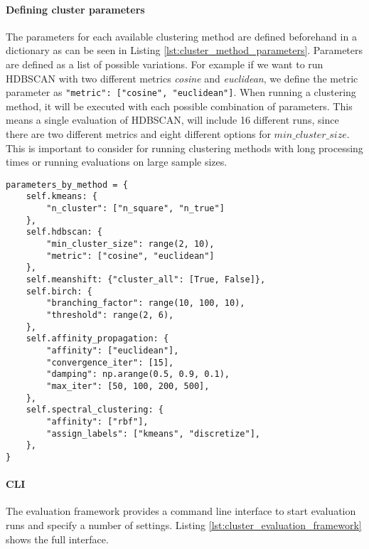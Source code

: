 \paragraph{Defining cluster parameters} The parameters for each available clustering method are defined beforehand in a dictionary as can be seen in Listing \ref{lst:cluster_method_parameters}. Parameters are defined as a list of possible variations. For example if we want to run HDBSCAN with two different metrics  \textit{cosine} and \textit{euclidean}, we define the metric parameter as \lstinline{"metric": ["cosine", "euclidean"]}. When running a clustering method, it will be executed with each possible combination of parameters. This means a single evaluation of HDBSCAN, will include 16 different runs, since there are two different metrics and eight different options for $min\_cluster\_size$. This is important to consider for running clustering methods with long processing times or running evaluations on large sample sizes. 

\begin{lstlisting}[caption=Predefined parameters for different clustering methods,label={lst:cluster_method_parameters}]
parameters_by_method = {
    self.kmeans: {
        "n_cluster": ["n_square", "n_true"]
    },
    self.hdbscan: {
        "min_cluster_size": range(2, 10),
        "metric": ["cosine", "euclidean"]
    },
    self.meanshift: {"cluster_all": [True, False]},
    self.birch: {
        "branching_factor": range(10, 100, 10),
        "threshold": range(2, 6),
    },
    self.affinity_propagation: {
        "affinity": ["euclidean"],
        "convergence_iter": [15],
        "damping": np.arange(0.5, 0.9, 0.1),
        "max_iter": [50, 100, 200, 500],
    },
    self.spectral_clustering: {
        "affinity": ["rbf"],
        "assign_labels": ["kmeans", "discretize"],
    },
}
\end{lstlisting}

\paragraph{CLI} The evaluation framework provides a command line interface to start evaluation runs and specify a number of settings. Listing \ref{lst:cluster_evaluation_framework} shows the full interface.  

